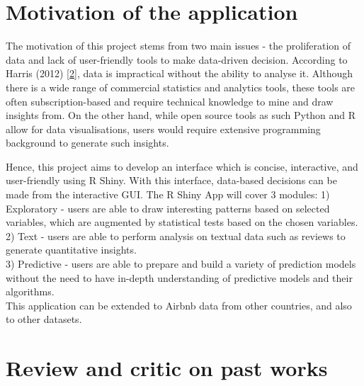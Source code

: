 \documentclass{acm_proc_article-sp}
\begin{document}
\hypertarget{motivation-of-the-application}{%
\section{Motivation of the
application}\label{motivation-of-the-application}}

The motivation of this project stems from two main issues - the
proliferation of data and lack of user-friendly tools to make
data-driven decision. According to Harris (2012)
{[}\protect\hyperlink{ref-harris_2014}{2}{]}, data is impractical
without the ability to analyse it. Although there is a wide range of
commercial statistics and analytics tools, these tools are often
subscription-based and require technical knowledge to mine and draw
insights from. On the other hand, while open source tools as such Python
and R allow for data visualisations, users would require extensive
programming background to generate such insights.

Hence, this project aims to develop an interface which is concise,
interactive, and user-friendly using R Shiny. With this interface,
data-based decisions can be made from the interactive GUI. The R Shiny
App will cover 3 modules: 1) Exploratory - users are able to draw
interesting patterns based on selected variables, which are augmented by
statistical tests based on the chosen variables. 2) Text - users are
able to perform analysis on textual data such as reviews to generate
quantitative insights.\\
3) Predictive - users are able to prepare and build a variety of
prediction models without the need to have in-depth understanding of
predictive models and their algorithms.\\
This application can be extended to Airbnb data from other countries,
and also to other datasets.

\hypertarget{review-and-critic-on-past-works}{%
\section{Review and critic on past
works}\label{review-and-critic-on-past-works}}
\end{document}
